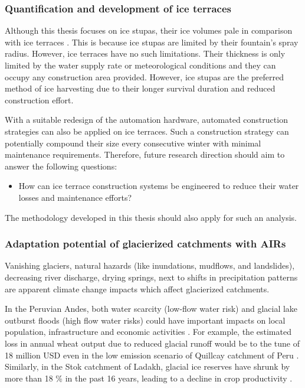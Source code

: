 \subsubsection{Quantification and development of ice terraces}

Although this thesis focuses on ice stupas, their ice volumes pale in comparison with ice terraces
\citep{nusserSociohydrologyArtificialGlaciers2019}. This is because ice stupas are limited by their fountain's
spray radius. However, ice terraces have no such limitations. Their thickness is only limited by the water
supply rate or meteorological conditions and they can occupy any construction area provided. However, ice stupas
are the preferred method of ice harvesting due to their longer survival duration and reduced construction
effort.

With a suitable redesign of the automation hardware, automated construction strategies can also be applied on
ice terraces. Such a construction strategy can potentially compound their size every consecutive winter with
minimal maintenance requirements. Therefore, future research direction should aim to answer the following
questions:

\begin{itemize}

	\item How can ice terrace construction systems be engineered to reduce their water losses and maintenance
	      efforts?

\end{itemize}

The methodology developed in this thesis should also apply for such an analysis.

\subsubsection{Adaptation potential of glacierized catchments with AIRs}

Vanishing glaciers, natural hazards (like inundations, mudflows, and landslides), decreasing river discharge,
drying springs, next to shifts in precipitation patterns are apparent climate change impacts which affect
glacierized catchments.

In the Peruvian Andes, both water scarcity (low-flow water risk) and glacial lake outburst floods (high flow
water risks) could have important impacts on local population, infrastructure and economic activities
\citep{motschmannIntegratedAssessmentsWater2020}. For example, the estimated loss in annual wheat output due to
reduced glacial runoff would be to the tune of 18 million USD even in the low emission scenario of Quillcay
catchment of Peru \citep{motschmannLossesDamagesConnected2020}. Similarly, in the Stok catchment of Ladakh,
glacial ice reserves have shrunk by more than 18 \% in the past 16 years, leading to a decline in crop
productivity \citep{sohebSpatiotemporalQuantificationKey2022}.

